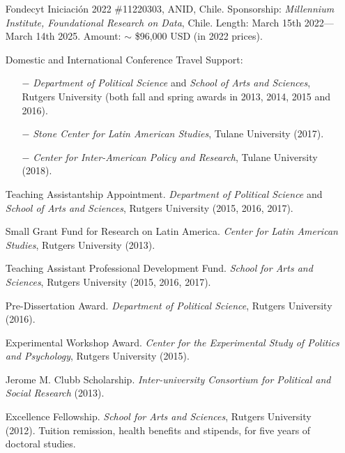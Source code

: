 \begin{itemize}

	\item[\textcolor{gray}{\textbullet}] Fondecyt Iniciaci\'on 2022 \#11220303, ANID, Chile. Sponsorship: \emph{Millennium Institute, Foundational Research on Data}, Chile. Length: March 15th 2022---March 14th 2025. Amount: $\sim$ \$96,000 USD (in 2022 prices).

	
	\item[\textcolor{gray}{\textbullet}] Domestic and International Conference Travel Support: 
		\begin{itemize}
			
			\item[$-$] \emph{Department of Political Science} and \emph{School of Arts and Sciences}, Rutgers University (both fall and spring awards in 2013, 2014, 2015 and 2016).
			
			\item[$-$] \emph{Stone Center for Latin American Studies}, Tulane University (2017).

			\item[$-$] \emph{Center for Inter-American Policy and Research}, Tulane University (2018).
		\end{itemize}
	
	\item[\textcolor{gray}{\textbullet}] Teaching Assistantship Appointment. \emph{Department of Political Science} and \emph{School of Arts and Sciences}, Rutgers University (2015, 2016, 2017).
	
	\item[\textcolor{gray}{\textbullet}] Small Grant Fund for Research on Latin America. \emph{Center for Latin American Studies}, Rutgers University (2013).
	
	\item[\textcolor{gray}{\textbullet}] Teaching Assistant Professional Development Fund. \emph{School for Arts and Sciences}, Rutgers University (2015, 2016, 2017).
	
	\item[\textcolor{gray}{\textbullet}] Pre-Dissertation Award. \emph{Department of Political Science}, Rutgers University (2016).
	
	\item[\textcolor{gray}{\textbullet}] Experimental Workshop Award. \emph{Center for the Experimental Study of Politics and Psychology}, Rutgers University (2015).
	
	\item[\textcolor{gray}{\textbullet}] Jerome M. Clubb Scholarship. \emph{Inter-university Consortium for Political and Social Research} (2013).
	
	\item[\textcolor{gray}{\textbullet}] Excellence Fellowship. \emph{School for Arts and Sciences}, Rutgers University (2012). Tuition remission, health benefits and stipends, for five years of doctoral studies.
\end{itemize}